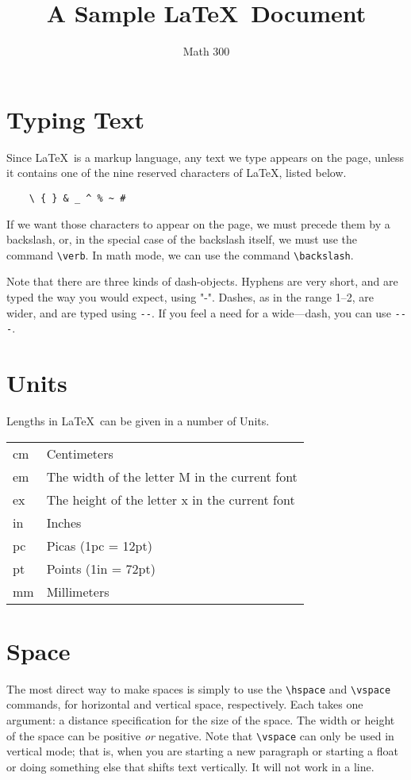 \documentclass[12pt]{article}
\title{A Sample \LaTeX\ Document}
\author{Math 300}
\begin{document}
\maketitle

\section{Typing Text}
Since \LaTeX\ is a markup language, any text we
type appears on the page, unless it contains
one of the nine reserved characters of \LaTeX, listed
below.
\begin{verbatim}
    \ { } & _ ^ % ~ #
\end{verbatim}
If we want those characters to appear on the page, we
must precede them by a backslash, or, in the special
case of the backslash itself, we must use the 
command \verb(\verb(.
In math mode, we can use the command
\verb(\backslash(.

Note that there are three kinds of dash-objects.
Hyphens 
are very short, and are typed the way you would expect, using
"-".
Dashes, as in the range 1--2, are wider, and are typed
using \verb+--+.
If you feel a need for a wide---dash, you can
use \verb+---+.

\section{Units}
Lengths in \LaTeX\ can be given in a number of Units.\\
\begin{tabular}{ll}
    cm & Centimeters\\
    em & The width of the letter M in the current font\\
    ex & The height of the letter x in the current font\\
    in & Inches\\
    pc & Picas (1pc = 12pt)\\
    pt & Points (1in = 72pt)\\
    mm & Millimeters
\end{tabular}

\section{Space}
The most direct way to make spaces is simply to use the
\verb(\hspace( and \verb(\vspace( commands, for horizontal
and vertical space, respectively.
Each takes one
argument: a distance specification for the size of the space.
The width or height of the space can be positive {\em or}
negative.
Note that \verb(\vspace( can only be used in 
vertical mode; that is, when you are starting a new paragraph
or starting a float or doing something else that shifts text
vertically.
It will not work in a line.
\end{document}
